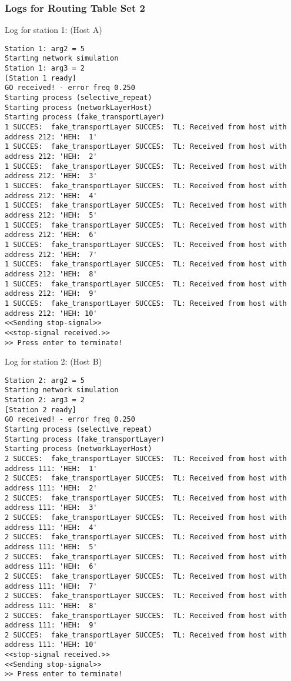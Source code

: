 \subsubsection{Logs for Routing Table Set 2}
Log for station 1: (Host A)
\begin{lstlisting}[breaklines=true]
Station 1: arg2 = 5
Starting network simulation
Station 1: arg3 = 2
[Station 1 ready]
GO received! - error freq 0.250
Starting process (selective_repeat)
Starting process (networkLayerHost)
Starting process (fake_transportLayer)
1 SUCCES:  fake_transportLayer SUCCES:  TL: Received from host with address 212: 'HEH:  1'
1 SUCCES:  fake_transportLayer SUCCES:  TL: Received from host with address 212: 'HEH:  2'
1 SUCCES:  fake_transportLayer SUCCES:  TL: Received from host with address 212: 'HEH:  3'
1 SUCCES:  fake_transportLayer SUCCES:  TL: Received from host with address 212: 'HEH:  4'
1 SUCCES:  fake_transportLayer SUCCES:  TL: Received from host with address 212: 'HEH:  5'
1 SUCCES:  fake_transportLayer SUCCES:  TL: Received from host with address 212: 'HEH:  6'
1 SUCCES:  fake_transportLayer SUCCES:  TL: Received from host with address 212: 'HEH:  7'
1 SUCCES:  fake_transportLayer SUCCES:  TL: Received from host with address 212: 'HEH:  8'
1 SUCCES:  fake_transportLayer SUCCES:  TL: Received from host with address 212: 'HEH:  9'
1 SUCCES:  fake_transportLayer SUCCES:  TL: Received from host with address 212: 'HEH: 10'
<<Sending stop-signal>>
<<stop-signal received.>>
>> Press enter to terminate!
\end{lstlisting}

Log for station 2: (Host B)
\begin{lstlisting}[breaklines=true]
Station 2: arg2 = 5
Starting network simulation
Station 2: arg3 = 2
[Station 2 ready]
GO received! - error freq 0.250
Starting process (selective_repeat)
Starting process (fake_transportLayer)
Starting process (networkLayerHost)
2 SUCCES:  fake_transportLayer SUCCES:  TL: Received from host with address 111: 'HEH:  1'
2 SUCCES:  fake_transportLayer SUCCES:  TL: Received from host with address 111: 'HEH:  2'
2 SUCCES:  fake_transportLayer SUCCES:  TL: Received from host with address 111: 'HEH:  3'
2 SUCCES:  fake_transportLayer SUCCES:  TL: Received from host with address 111: 'HEH:  4'
2 SUCCES:  fake_transportLayer SUCCES:  TL: Received from host with address 111: 'HEH:  5'
2 SUCCES:  fake_transportLayer SUCCES:  TL: Received from host with address 111: 'HEH:  6'
2 SUCCES:  fake_transportLayer SUCCES:  TL: Received from host with address 111: 'HEH:  7'
2 SUCCES:  fake_transportLayer SUCCES:  TL: Received from host with address 111: 'HEH:  8'
2 SUCCES:  fake_transportLayer SUCCES:  TL: Received from host with address 111: 'HEH:  9'
2 SUCCES:  fake_transportLayer SUCCES:  TL: Received from host with address 111: 'HEH: 10'
<<stop-signal received.>>
<<Sending stop-signal>>
>> Press enter to terminate!
\end{lstlisting}

